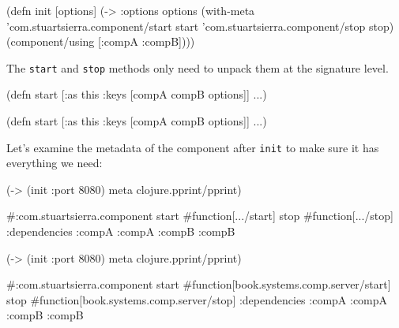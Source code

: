 \else

\begin{english}
  \begin{clojure}
(defn init [options]
  (-> {:options options}
      (with-meta
        {'com.stuartsierra.component/start start
         'com.stuartsierra.component/stop stop})
      (component/using [:compA :compB])))
  \end{clojure}
\end{english}

\fi

\noindent
The \verb|start| and \verb|stop| methods only need to unpack them at the signature level.

\ifnarrow

\begin{english}
  \begin{clojure}
(defn start
  [{:as this
    :keys [compA compB options]}]
  ...)
  \end{clojure}
\end{english}

\else

\begin{english}
  \begin{clojure}
(defn start
  [{:as this :keys [compA compB options]}]
  ...)
  \end{clojure}
\end{english}

\fi

Let's examine the metadata of the component after \verb|init| to make sure it has everything we need:

\ifnarrow

\begin{english}
  \begin{clojure}
(-> (init {:port 8080})
    meta
    clojure.pprint/pprint)

#:com.stuartsierra.component
 {start #function[.../start]
  stop  #function[.../stop]
  :dependencies
  {:compA :compA :compB :compB}}
  \end{clojure}
\end{english}

\else

\begin{english}
  \begin{clojure}
(-> (init {:port 8080})
    meta
    clojure.pprint/pprint)

#:com.stuartsierra.component
  {start #function[book.systems.comp.server/start]
   stop #function[book.systems.comp.server/stop]
   :dependencies {:compA :compA :compB :compB}}
  \end{clojure}
\end{english}

